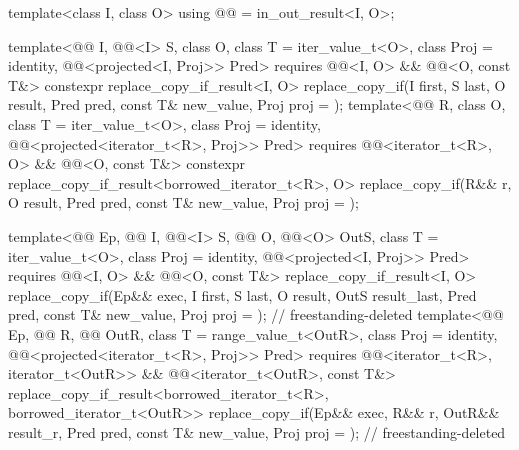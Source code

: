 \begin{codeblock}
{{    template<class I, class O>
      using @@ = in_out_result<I, O>;

    template<@@ I, @@<I> S, class O, class T = iter_value_t<O>,
             class Proj = identity, @@<projected<I, Proj>> Pred>
      requires @@<I, O> && @@<O, const T&>
      constexpr replace_copy_if_result<I, O>
        replace_copy_if(I first, S last, O result, Pred pred, const T& new_value,
                        Proj proj = {});
    template<@@ R, class O, class T = iter_value_t<O>, class Proj = identity,
             @@<projected<iterator_t<R>, Proj>> Pred>
      requires @@<iterator_t<R>, O> && @@<O, const T&>
      constexpr replace_copy_if_result<borrowed_iterator_t<R>, O>
        replace_copy_if(R&& r, O result, Pred pred, const T& new_value,
                        Proj proj = {});

    template<@@ Ep, @@ I, @@<I> S,
             @@ O, @@<O> OutS, class T = iter_value_t<O>,
             class Proj = identity, @@<projected<I, Proj>> Pred>
      requires @@<I, O> && @@<O, const T&>
      replace_copy_if_result<I, O>
        replace_copy_if(Ep&& exec, I first, S last, O result, OutS result_last,
                        Pred pred, const T& new_value, Proj proj = {});     // freestanding-deleted
    template<@@ Ep, @@ R, @@ OutR,
             class T = range_value_t<OutR>, class Proj = identity,
             @@<projected<iterator_t<R>, Proj>> Pred>
      requires @@<iterator_t<R>, iterator_t<OutR>> &&
               @@<iterator_t<OutR>, const T&>
      replace_copy_if_result<borrowed_iterator_t<R>, borrowed_iterator_t<OutR>>
        replace_copy_if(Ep&& exec, R&& r, OutR&& result_r, Pred pred, const T& new_value,
                        Proj proj = {});                                    // freestanding-deleted
  }

}
\end{codeblock}
